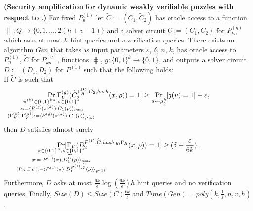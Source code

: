 %
%
\begin{lemma}\textbf{(Security amplification for dynamic weakly verifiable puzzles with respect to \boldmath{$\hash$}.)}
  \label{lemma:sec_amp_for_p_hash}
  For fixed $P_n^{(1)}$ let $\widetilde{C} := (C_1, \widetilde{C}_2)$ has oracle access to a function $\hash: Q \rightarrow \{0,1,\dots, 2(h+v-1)\}$
  and a solver circuit $C := (C_1, C_2)$ for $P_{kn}^{(g)}$ which asks at most $h$ hint queries and $v$ verification queries.
  There exists an algorithm $\mathit{Gen}$ that takes as input parameters $\varepsilon$, $\delta$, $n$, $k$,
  has oracle access to $P_n^{(1)}$,  $\widetilde{C}$ for $P_{kn}^{(g)}$, functions $\hash$, $g: \{0,1\}^{k} \rightarrow \{0,1\}$,
  and outputs a solver circuit $D := (D_1, D_2)$ for $P^{(1)}$ such that the following holds: \\
  If $\widetilde{C}$ is such that
  \begin{align*}
    \underset{\mathclap{\substack{
          \pi^{(k)} \in \{0,1\}^{kn}, \rho \in \{0,1\}^{*} \\
          x:= \langle P^{(g)}(\pi^{(k)}), {C}_1(\rho) \rangle_{\mathit{trans}} \\
          (\Gamma_H^{(k)}, \Gamma_V^{(g)}) := \langle P^{(g)}(\pi^{(k)}), C_1(\rho) \rangle_{P^{(g)}}}}}
    {\Pr}[\Gamma_V^{(g)}(\widetilde{C}_2^{\Gamma_H^{(k)}, C_2, \hash}(x,\rho)) = 1]
    \geq \underset{u \leftarrow \mu_\delta^k}{\Pr}[g(u) = 1] + \varepsilon,
  \end{align*}
  then $D$ satisfies almost surely
  \begin{align*}
    \underset{
      \mathclap{
      \substack{
        \pi \in \{0,1\}^{n}, \rho \in \{0,1\}^{*} \\
        x := \langle P^{(1)}(\pi), D_1^{\widetilde{C}}(\rho) \rangle_{\mathit{trans}} \\
        (\Gamma_H, \Gamma_V) := \langle P^{(1)}(\pi), D_1^{P^{(1)}, \widetilde{C}}(\rho) \rangle_{P^{(1)}}}}}
    {\Pr}[\Gamma_V(D_2^{P^{(1)}, \widetilde{C}, \hash, g, \Gamma_H}(x, \rho)) = 1] \geq (\delta + \frac{\varepsilon}{6k}).
  \end{align*}
  Furthermore, $D$
  asks at most $\frac{6k}{\epsilon}\log\left(\frac{6k}{\epsilon}\right) h$ hint queries and no verification queries.
  Finally, $\mathit{Size}(D) \leq \mathit{Size}(C)\frac{6k}{\varepsilon}$ and $\mathit{Time}(\mathit{Gen}) = \mathit{poly}(k, \frac{1}{\varepsilon}, n, v, h)$.
\end{lemma}
%
%

